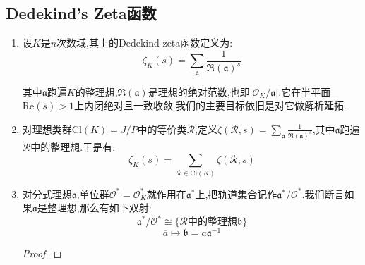 \subsection{Dedekind's Zeta函数}
\begin{enumerate}
	\item 设$K$是$n$次数域,其上的Dedekind zeta函数定义为:
	$$\zeta_K(s)=\sum_{\mathfrak{a}}\frac{1}{\mathfrak{R}(\mathfrak{a})^s}$$
	
	其中$\mathfrak{a}$跑遍$K$的整理想,$\mathfrak{R}(\mathfrak{a})$是理想的绝对范数,也即$|\mathscr{O}_K/\mathfrak{a}|$.它在半平面$\mathrm{Re}(s)>1$上内闭绝对且一致收敛.我们的主要目标依旧是对它做解析延拓.
	\item 对理想类群$\mathrm{Cl}(K)=J/P$中的等价类$\mathscr{R}$,定义$\zeta(\mathscr{R},s)=\sum_{\mathfrak{a}}\frac{1}{\mathfrak{R}(\mathfrak{a})^s}$,其中$\mathfrak{a}$跑遍$\mathscr{R}$中的整理想.于是有:
	$$\zeta_K(s)=\sum_{\mathscr{R}\in\mathrm{Cl}(K)}\zeta(\mathscr{R},s)$$
	\item 对分式理想$\mathfrak{a}$,单位群$\mathscr{O}^*=\mathscr{O}_K^*$就作用在$\mathfrak{a}^*$上,把轨道集合记作$\mathfrak{a}^*/\mathscr{O}^*$.我们断言如果$\mathfrak{a}$是整理想,那么有如下双射:
	$$\mathfrak{a}^*/\mathscr{O}^*\cong\{\mathscr{R}\text{中的整理想}\mathfrak{b}\}$$
	$$\overline{a}\mapsto\mathfrak{b}=a\mathfrak{a}^{-1}$$
	\begin{proof}
		

\end{proof}
\end{enumerate}
